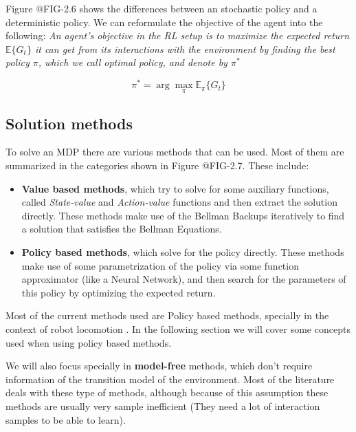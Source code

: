 \figRlPolicies

Figure @FIG-2.6 shows the differences between an stochastic policy and a deterministic
policy. We can reformulate the objective of the agent into the following: \textit{An agent's objective
in the RL setup is to maximize the expected return $\mathbb{E} \lbrace G_{t} \rbrace$ it
can get from its interactions with the environment by finding the best policy $\pi$, which
we call optimal policy, and denote by $\pi^{*}$}

\begin{equation}
    \pi^{*} = \arg \max_{\pi} \mathbb{E}_{\pi} \lbrace G_{t} \rbrace
\end{equation}

\subsection{Solution methods}

\figRlMethodsLandspace

To solve an MDP there are various methods that can be used. Most of them are
summarized in the categories shown in Figure @FIG-2.7. These include:

\begin{itemize}
    \item \textbf{Value based methods}, which try to solve for some auxiliary
          functions, called \textit{State-value} and \textit{Action-value} functions
          and then extract the solution directly. These methods make use of the Bellman
          Backups iteratively to find a solution that satisfies the Bellman Equations.
    \item \textbf{Policy based methods}, which solve for the policy directly. These methods
          make use of some parametrization of the policy via some function approximator
          (like a Neural Network), and then search for the parameters of this policy
          by optimizing the expected return.
\end{itemize}

Most of the current methods used are Policy based methods, specially in the context
of robot locomotion . In the following section we will cover some concepts used when
using policy based methods. 

We will also focus specially in \textbf{model-free} methods,
which don't require information of the transition model of the environment. Most of the
literature deals with these type of methods, although because of this assumption these
methods are usually very sample inefficient (They need a lot of interaction samples to be
able to learn).

